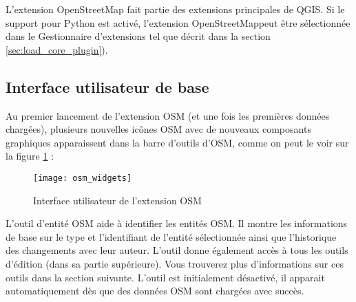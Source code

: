 L'extension OpenStreetMap fait partie des extensions principales de QGIS. Si le support pour Python est activé, l'extension \og OpenStreetMap\fg peut être sélectionnée dans le Gestionnaire d'extensions tel que décrit dans la section \ref{sec:load_core_plugin}).

\subsection{Interface utilisateur de base}

Au premier lancement de l'extension OSM (et une fois les premières données chargées), plusieurs nouvelles icônes OSM avec de nouveaux composants graphiques apparaissent dans la barre d'outils d'OSM, comme on peut le voir sur la figure \ref{fig:osmwidget} :

\begin{figure}[ht]
   \centering
   \texttt{[image: osm\_widgets]}
   \caption{Interface utilisateur de l'extension OSM \nixcaption}\label{fig:osmwidget}
\end{figure}


L'outil d'entité OSM aide à identifier les entités OSM. Il montre les informations de base sur le type et l'identifiant de l'entité sélectionnée ainsi que l'historique des changements avec leur auteur. L'outil donne également accès à tous les outils d'édition (dans sa partie supérieure). Vous trouverez plus d'informations sur ces outils dans la section suivante. L'outil est initialement désactivé, il apparait automatiquement dès que des données OSM sont chargées avec succès.

